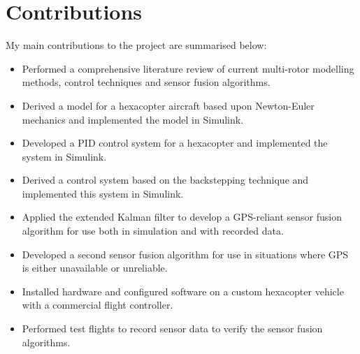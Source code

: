 
\chapter*{Contributions}\label{Contributions}
My main contributions to the project are summarised below:
\begin{itemize}
\item Performed a comprehensive literature review of current multi-rotor modelling methods, control techniques and sensor fusion algorithms.
\item Derived a model for a hexacopter aircraft based upon Newton-Euler mechanics and implemented the model in Simulink.
\item Developed a PID control system for a hexacopter and implemented the system in Simulink.
\item Derived a control system based on the backstepping technique and implemented this system in Simulink.
\item Applied the extended Kalman filter to develop a GPS-reliant sensor fusion algorithm for use both in simulation and with recorded data.
\item Developed a second sensor fusion algorithm for use in situations where GPS is either unavailable or unreliable.
\item Installed hardware and configured software on a custom hexacopter vehicle with a commercial flight controller.
\item Performed test flights to record sensor data to verify the sensor fusion algorithms.
\end{itemize}

\par\noindent\makebox[2.5in]{\hrulefill} \hfill\makebox[2.0in]{\hrulefill}%
    \par\noindent{}      \hfill{}%
\clearpage


